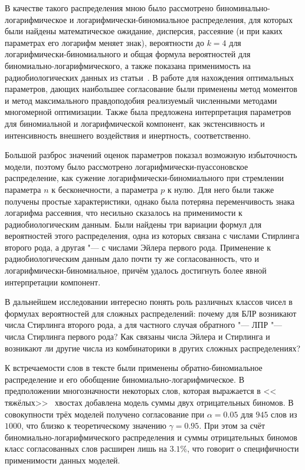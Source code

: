 \documentclass[12pt, specialist, subf, substylefile = spbu.rtx]{disser}
\begin{document}
	В качестве такого распределения мною было рассмотрено биноминально-логарифмическое и логарифмически-биномиальное распределения, для которых были найдены математическое ожидание, дисперсия, рассеяние (и при каких параметрах его логарифм меняет знак), вероятности до $ k = 4 $ для логарифмически-биномиального и общая формула вероятностей для биномиально-логарифмического, а также показана применимость на радиобиологических данных из статьи~\cite{bib:alexeeva2008}. В работе для нахождения оптимальных параметров, дающих наибольшее согласование были применены метод моментов и метод максимального правдоподобия реализуемый численными методами многомерной оптимизации. Также была предложена интерпретация параметров для биномиальной и логарифмической компонент, как экстенсивность и интенсивность внешнего воздействия и инертность, соответственно.
	
	Большой разброс значений оценок параметров показал возможную избыточность модели, поэтому было рассмотрено логарифмически-пуассоновское распределение, как сужение логарифмически-биномиального при стремлении параметра $n$ к бесконечности, а параметра $p$ к нулю. Для него были также получены простые характеристики, однако была потеряна переменчивость знака логарифма рассеяния, что несильно сказалось на применимости к радиобиологическим данным. Были найдены три вариации формул для вероятностей этого распределения, одна из которых связана с числами Стирлинга второго рода, а другая "--- с числами Эйлера первого рода. Применение к радиобиологическим данным дало почти ту же согласованность, что и логарифмически-биномиальное, причём удалось достигнуть более явной интерпретации компонент.
	
	В дальнейшем исследовании интересно понять роль различных классов чисел в формулах вероятностей для сложных распределений: почему для БЛР возникают числа Стирлинга второго рода, а для частного случая обратного "--- ЛПР "--- числа Стирлинга первого рода? Как связаны числа Эйлера и Стирлинга и возникают ли другие числа из комбинаторики в других сложных распределениях?
	
	К встречаемости слов в тексте были применены обратно-биномиальное распределение и его обобщение биномиально-логарифмическое. В предположении многозначности некоторых слов, которая выражается в << тяжёлых>>~ хвостах добавлена модель суммы двух отрицательных биномов. В совокупности трёх моделей получено согласование при $\alpha = 0.05$ для $945$ слов из $1000$, что близко к теоретическому значению $\gamma = 0.95$. При этом за счёт биномиально-логарифмического распределения и суммы отрицательных биномов класс согласованных слов расширен лишь на $3.1 \%$, что говорит о специфичности применимости данных моделей.
	
\end{document}
